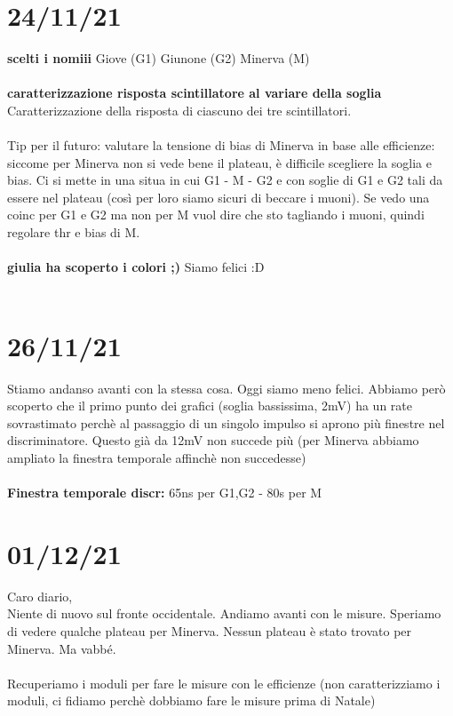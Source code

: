 \documentclass{article}
\begin{document}
\section{24/11/21}
\textbf{scelti i nomiii}
Giove (G1)
Giunone (G2)
Minerva (M)\\\\
\textbf{caratterizzazione risposta scintillatore al variare della soglia}\\
Caratterizzazione della risposta di ciascuno dei tre scintillatori.\\\\
Tip per il futuro: valutare la tensione di bias di Minerva in base alle efficienze: siccome per Minerva non si vede bene il plateau, è difficile scegliere la soglia e bias. Ci si mette in una situa in cui G1 - M - G2 e con soglie di G1 e G2 tali da essere nel plateau (così per loro siamo sicuri di beccare i muoni). Se vedo una coinc per G1 e G2 ma non per M vuol dire che sto tagliando i muoni, quindi regolare thr e bias di M.\\\\
\textbf{giulia ha scoperto i colori ;)}
Siamo felici :D \\\\


\section{26/11/21}
Stiamo andanso avanti con la stessa cosa. Oggi siamo meno felici. Abbiamo però scoperto che il primo punto dei grafici (soglia bassissima, 2mV) ha un rate sovrastimato perchè al passaggio di un singolo impulso si aprono più finestre nel discriminatore. Questo già da 12mV non succede più (per Minerva abbiamo ampliato la finestra temporale affinchè non succedesse)\\\\
\textbf{Finestra temporale discr:} 65ns per G1,G2 - 80s per M

\section{01/12/21}
Caro diario,\\
Niente di nuovo sul fronte occidentale. Andiamo avanti con le misure. Speriamo di vedere qualche plateau per Minerva. Nessun plateau è stato trovato per Minerva. Ma vabbé.\\\\
Recuperiamo i moduli per fare le misure con le efficienze (non caratterizziamo i moduli, ci fidiamo perchè dobbiamo fare le misure prima di Natale)
\end{document}
